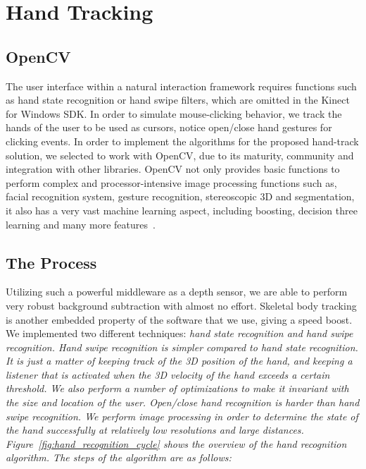 \chapter{Hand Tracking}
\label{appendix_hand_tracking}

\section{OpenCV}
 
The user interface within a natural interaction framework requires functions such as hand state recognition or hand swipe filters, which are omitted in the Kinect for Windows SDK. In order to simulate mouse-clicking behavior, we track the hands of the user to be used as cursors, notice open/close hand gestures for clicking events. In order to implement the algorithms for the proposed hand-track solution, we selected to work with OpenCV, due to its maturity, community and integration with other libraries. OpenCV not only provides basic functions to perform complex and processor-intensive image processing functions such as, facial recognition system, gesture recognition, stereoscopic 3D and segmentation, it also has a very vast machine learning aspect, including boosting, decision three learning and many more features~\cite{opencv_library}.

\section{The Process}

Utilizing such a powerful middleware as a depth sensor, we are able to perform very robust background subtraction with almost no effort. Skeletal body tracking is another embedded property of the software that we use, giving a speed boost. We implemented two different techniques: \em{hand state recognition} and \em{hand swipe recognition}. Hand swipe recognition is simpler compared to hand state recognition. It is just a matter of keeping track of the 3D position of the hand, and keeping a listener that is activated when the 3D velocity of the hand exceeds a certain threshold. We also perform a number of optimizations to make it invariant with the size and location of the user. Open/close hand recognition is harder than hand swipe recognition. We perform image processing in order to determine the state of the hand successfully at relatively low resolutions and large distances. Figure~\ref{fig:hand_recognition_cycle} shows the overview of the hand recognition algorithm. The steps of the algorithm are as follows:

